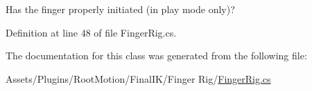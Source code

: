 Has the finger properly initiated (in play mode only)? 



Definition at line 48 of file Finger\+Rig.\+cs.



The documentation for this class was generated from the following file\+:\begin{DoxyCompactItemize}
\item 
Assets/\+Plugins/\+Root\+Motion/\+Final\+I\+K/\+Finger Rig/\mbox{\hyperlink{_finger_rig_8cs}{Finger\+Rig.\+cs}}\end{DoxyCompactItemize}
